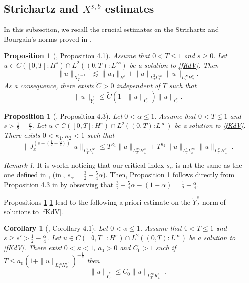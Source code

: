 \documentclass{amsart}
\newtheorem{proposition}[theorem]{Proposition}
\newtheorem{corollary}[theorem]{Corollary}
\theoremstyle{definition}
\theoremstyle{remark}
\newtheorem{remark}[theorem]{Remark}
\numberwithin{equation}{section}
\begin{document}
\subsection{Strichartz and $X^{s,b}$ estimates}
In this subsection, we recall the crucial estimates on the Strichartz and Bourgain's norms proved in \cite{MPV}.
\begin{proposition}[\cite{MPV}, Proposition 4.1]\label{prop:xs-1,1}
Assume that $0<T\le 1$ and $s\ge 0$. Let $u \in C([0,T] : H^s) \cap L^2((0,T):L^\infty)$ be a solution to \eqref{fKdV}. Then
\begin{equation} \label{be.0}
\|u\|_{X^{s-1,1}_T} \lesssim \|u_0\|_{H^s} + \|u\|_{L^2_TL^\infty_x} \|u\|_{L^\infty_TH^s_x}.
\end{equation}
As a consequence, there exists $\widetilde{C}>0$ independent of $T$ such that
\begin{equation}\label{est:ytilde}
  \|u\|_{\widetilde{Y}^s_T} \le  \widetilde{C}(1+\|u\|_{Y^s_T})\|u\|_{Y^s_T} .
\end{equation}
\end{proposition}

\begin{proposition}[\cite{MPV}, Proposition 4.3]\label{propse}
Let $0<\alpha \le 1$. Assume that $0<T\le 1$ and $s>\frac12-\frac{\alpha}4$. Let $u \in C([0,T] : H^s) \cap L^2((0,T):L^\infty)$ be a solution to \eqref{fKdV}. There exists  $ 0< \kappa_1,\kappa_2<1$ such that  
\begin{equation}\label{se.2}
\|J_x^{(s-(\frac12-\frac \alpha 4))_-}u\|_{L^2_T L^\infty_x}  \le   T^{\kappa_1}\|u\|_{L^\infty_T H^s_x} +T^{\kappa_2}\|u\|_{L^2_TL^\infty_x} \|u\|_{L^\infty_TH^s_x} \; .
\end{equation}
\end{proposition}
\begin{remark}
 It is worth noticing that our critical index $s_\alpha$ is not the same as the one defined in \cite{MPV}, (in \cite{MPV}, $s_\alpha=\frac32-\frac54\alpha$). Then, Proposition \ref{propse} follows directly from Proposition 4.3 in \cite{MPV} by observing that $\frac32-\frac54\alpha-(1-\alpha)=\frac12-\frac{\alpha}4$.
\end{remark}

Propositions \ref{prop:xs-1,1}-\ref{propse} lead to  the following a priori estimate on the $\widetilde{Y}^s_T$-norm  of  solutions to \eqref{fKdV}.
\begin{corollary}[\cite{MPV}, Corollary 4.1]\label{prop:yst}
Let $0<\alpha \le 1$. Assume that $0<T\le 1$ and $s \ge s' >\frac12-\frac{\alpha}4$.  Let $u \in C([0,T] : H^s) \cap L^2((0,T):L^\infty)$ be a solution to \eqref{fKdV}. There exist  $ 0< \kappa<1 $, $a_0>0$ and $ C_0>1 $ such if $ T\le a_0(1+\|u\|_{L^\infty_{T} H^{s'}_x})^{-\frac{1}{\kappa}}$ then 
\begin{equation}\label{est:yst}
\|u\|_{\widetilde{Y}^s_T}   \le C_0   \|u\|_{L^\infty_T H^s_x} \; .
\end{equation}
\end{corollary}
\end{document}
